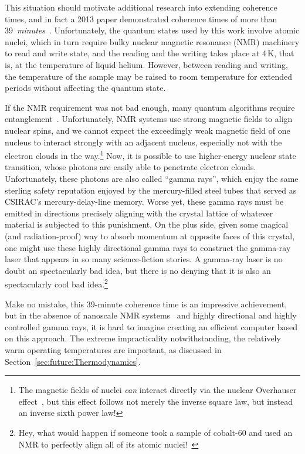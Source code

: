 This situation should motivate additional research into extending
coherence times, and in fact a 2013 paper demonstrated coherence
times of more than
39~\emph{minutes}~\cite{KamyarSaeedi2018QC-39-minutes}.
Unfortunately, the quantum states used by this work involve atomic nuclei,
which in turn require bulky nuclear magnetic resonance (NMR) machinery
to read and write state, and the reading and the writing takes place
at 4\,K, that is, at the temperature of liquid helium.
However, between reading and writing, the temperature of the sample may
be raised to room temperature for extended periods without affecting
the quantum state.

If the NMR requirement was not bad enough, many quantum algorithms require
entanglement~\cite{PeterWSchor2001QuantumAlgorithms}.
Unfortunately, NMR systems use strong magnetic fields to align
nuclear spins, and we cannot expect the exceedingly weak magnetic
field of one nucleus to interact strongly with an adjacent nucleus,
especially not with the electron clouds in the way.\footnote{
	The magnetic fields of nuclei \emph{can} interact directly
	via the nuclear Overhauser effect~\cite{PhysRev.92.411},
	but this effect follows not merely the inverse square law,
	but instead an inverse sixth power law!}
Now, it is possible to use higher-energy nuclear state transition,
whose photons are easily able to penetrate electron clouds.
Unfortunately, these photons are also called ``gamma rays'', which enjoy
the same sterling safety reputation enjoyed by the mercury-filled steel
tubes that served as CSIRAC's mercury-delay-line memory.
Worse yet, these gamma rays must be emitted in directions precisely
aligning with the crystal lattice of whatever material is subjected
to this punishment.
On the plus side, given some magical (and radiation-proof) way to absorb
momentum at opposite faces of this crystal, one might use these highly
directional gamma rays to construct the gamma-ray laser that appears in
so many science-fiction stories.
A gamma-ray laser is no doubt an spectacularly bad idea, but there is no
denying that it is also an spectacularly cool bad idea.\footnote{
	Hey, what would happen if someone took a sample of
	cobalt-60 and used an NMR to perfectly align all of its
	atomic nuclei!~\cite{1957PhRv..105.1413W}}

Make no mistake, this 39-minute coherence time is an impressive
achievement, but in the absence
of nanoscale NMR systems~\cite{HJMamin2013QC-nanoscale-NMR} and
highly directional and highly controlled gamma rays, it is
hard to imagine creating an efficient computer based on this approach.
The extreme impracticality notwithstanding, the relatively warm operating
temperatures are important, as discussed in
Section~\ref{sec:future:Thermodynamics}.

